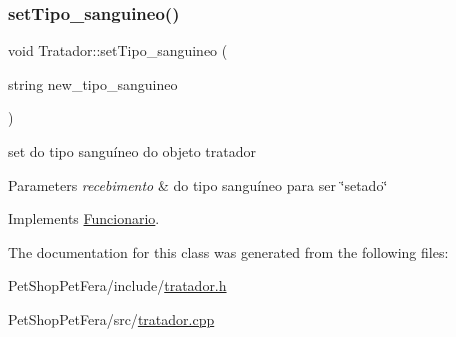 \subsubsection{\texorpdfstring{setTipo\_sanguineo()}{setTipo\_sanguineo()}}
{\footnotesize\ttfamily void Tratador\+::set\+Tipo\+\_\+sanguineo (\begin{DoxyParamCaption}\item[{string}]{new\+\_\+tipo\+\_\+sanguineo }\end{DoxyParamCaption})\hspace{0.3cm}{\ttfamily [virtual]}}



set do tipo sanguíneo do objeto tratador 


\begin{DoxyParams}{Parameters}
{\em recebimento} & do tipo sanguíneo para ser \char`\"{}setado\char`\"{} \\
\hline
\end{DoxyParams}


Implements \mbox{\hyperlink{class_funcionario}{Funcionario}}.



The documentation for this class was generated from the following files\+:\begin{DoxyCompactItemize}
\item 
Pet\+Shop\+Pet\+Fera/include/\mbox{\hyperlink{tratador_8h}{tratador.\+h}}\item 
Pet\+Shop\+Pet\+Fera/src/\mbox{\hyperlink{tratador_8cpp}{tratador.\+cpp}}\end{DoxyCompactItemize}

